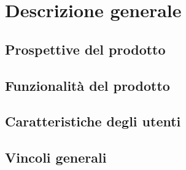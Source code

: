 \section{Descrizione generale}
\subsection{Prospettive del prodotto}
\subsection{Funzionalità del prodotto}
\subsection{Caratteristiche degli utenti}
\subsection{Vincoli generali}
